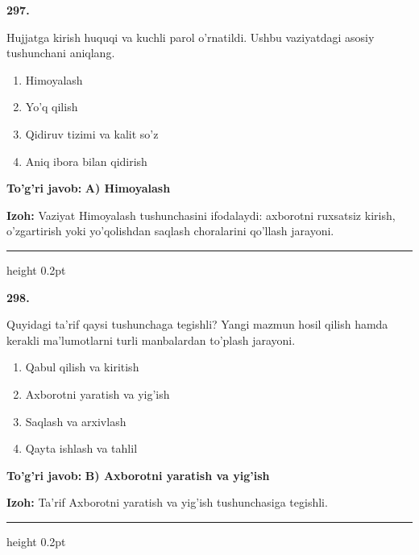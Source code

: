 \documentclass[10pt,a4paper,oneside]{article}
\begin{document}
\noindent\textbf{\color{ink}297.}
\par
Hujjatga kirish huquqi va kuchli parol o'rnatildi. Ushbu vaziyatdagi asosiy tushunchani aniqlang.
\begin{enumerate}[label=\Alph*),leftmargin=9mm]
\item Himoyalash
\item Yo'q qilish
\item Qidiruv tizimi va kalit so'z
\item Aniq ibora bilan qidirish
\end{enumerate}
\begin{tcolorbox}[enhanced,breakable,colback=teal!4,colframe=teal!50!black,boxrule=0.5pt,arc=1.1mm,left=3mm,right=3mm,top=1.7mm,bottom=1.7mm,before skip=2mm,after skip=2mm]
\textbf{\color{teal}To'g'ri javob:} \textbf{A) Himoyalash}
\par\smallskip
\textbf{Izoh:} Vaziyat Himoyalash tushunchasini ifodalaydi: axborotni ruxsatsiz kirish, o'zgartirish yoki yo'qolishdan saqlash choralarini qo'llash jarayoni.
\end{tcolorbox}
\vspace{2mm}\hrule height 0.2pt \vspace{3mm}

\noindent\textbf{\color{ink}298.}
\par
Quyidagi ta'rif qaysi tushunchaga tegishli? Yangi mazmun hosil qilish hamda kerakli ma'lumotlarni turli manbalardan to'plash jarayoni.
\begin{enumerate}[label=\Alph*),leftmargin=9mm]
\item Qabul qilish va kiritish
\item Axborotni yaratish va yig'ish
\item Saqlash va arxivlash
\item Qayta ishlash va tahlil
\end{enumerate}
\begin{tcolorbox}[enhanced,breakable,colback=teal!4,colframe=teal!50!black,boxrule=0.5pt,arc=1.1mm,left=3mm,right=3mm,top=1.7mm,bottom=1.7mm,before skip=2mm,after skip=2mm]
\textbf{\color{teal}To'g'ri javob:} \textbf{B) Axborotni yaratish va yig'ish}
\par\smallskip
\textbf{Izoh:} Ta'rif Axborotni yaratish va yig'ish tushunchasiga tegishli.
\end{tcolorbox}
\vspace{2mm}\hrule height 0.2pt \vspace{3mm}
\end{document}
